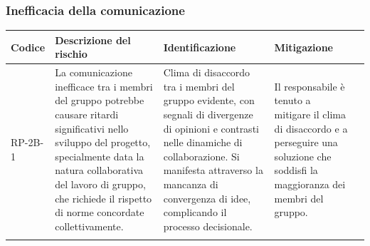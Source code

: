 \documentclass{article}
\begin{document}
\newpage
\subsubsection{Inefficacia della comunicazione}
\begin{table}[h]
    \centering
    \begin{tabularx}{\textwidth}{l>{\RaggedRight}X>{\RaggedRight}X>{\RaggedRight}X>{\RaggedRight}X}
    \toprule
    \rowcolor{gray!50}
    \textbf{Codice} & \textbf{Descrizione del rischio} & \textbf{Identificazione} & \textbf{Mitigazione} \\
    \midrule
    \addlinespace 
    RP-2B-1 & 
    La comunicazione inefficace tra i membri del gruppo potrebbe causare ritardi significativi nello sviluppo del progetto, specialmente data la natura collaborativa del lavoro di gruppo, che richiede il rispetto di norme concordate collettivamente.& 
    Clima di disaccordo tra i membri del gruppo evidente, con segnali di divergenze di opinioni e contrasti nelle dinamiche di collaborazione. Si manifesta attraverso la mancanza di convergenza di idee, complicando il processo decisionale. &
    Il responsabile è tenuto a mitigare il clima di disaccordo e a perseguire una soluzione che soddisfi la maggioranza dei membri del gruppo. \\
    \bottomrule
    \addlinespace 
    \end{tabularx}
\end{table}
\end{document}

